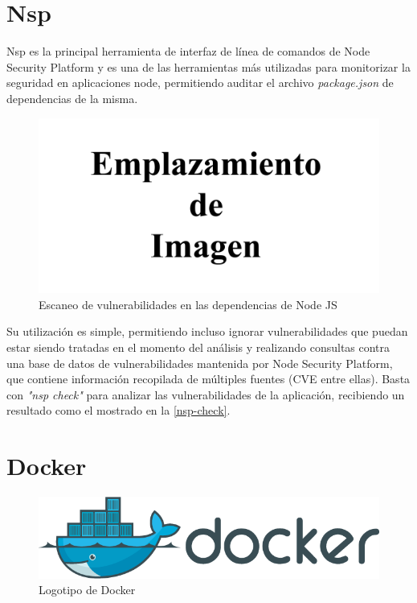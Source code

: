 
\section{Nsp}

Nsp es la principal herramienta de interfaz de línea de comandos de Node Security Platform y es una de las herramientas más utilizadas para monitorizar la seguridad en aplicaciones node, permitiendo auditar el archivo \textit{package.json} de dependencias de la misma.

\begin{figure}[htbp]
	\centering
	\includegraphics[width=0.80\linewidth]
	{figuras/emplazamiento-imagen.png}
	\caption{Escaneo de vulnerabilidades en las dependencias de Node JS}
	\label{nsp-check}
\end{figure}

Su utilización es simple, permitiendo incluso ignorar vulnerabilidades que puedan estar siendo tratadas en el momento del análisis y realizando consultas contra una base de datos de vulnerabilidades mantenida por Node Security Platform, que contiene información recopilada de múltiples fuentes (\gls{CVE} entre ellas). Basta con \textit{"nsp check"} para analizar las vulnerabilidades de la aplicación, recibiendo un resultado como el mostrado en la \autoref{nsp-check}.


\section{Docker}

\begin{figure}[htbp]
	\centering
	\includegraphics[width=0.80\linewidth]
	{entorno/figuras/Docker.png}
	\caption{Logotipo de Docker}
	\label{docker-logo}
\end{figure}

